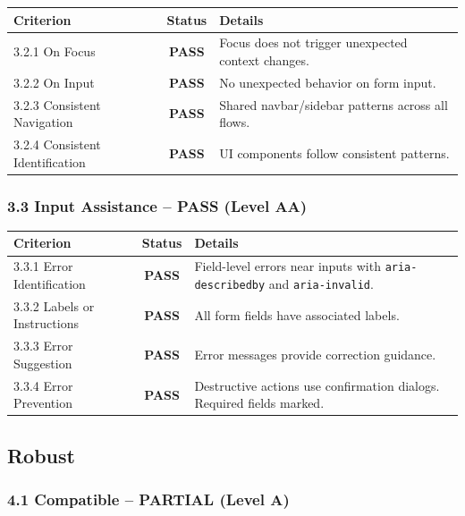 \documentclass[12pt,a4paper]{article}
\newcommand{\pass}{\textcolor{passgreen}{\textbf{PASS}}}
\newcommand{\partial}{\textcolor{warnorange}{\textbf{PARTIAL}}}
\begin{document}
\begin{table}[H]
\centering
\begin{tabularx}{\textwidth}{lcX}
\toprule
\textbf{Criterion} & \textbf{Status} & \textbf{Details} \\
\midrule
3.2.1 On Focus                 & \pass & Focus does not trigger unexpected context changes. \\
3.2.2 On Input                 & \pass & No unexpected behavior on form input. \\
3.2.3 Consistent Navigation    & \pass & Shared navbar/sidebar patterns across all flows. \\
3.2.4 Consistent Identification& \pass & UI components follow consistent patterns. \\
\bottomrule
\end{tabularx}
\end{table}

\subsubsection{3.3 Input Assistance -- \pass{} (Level AA)}

\begin{table}[H]
\centering
\begin{tabularx}{\textwidth}{lcX}
\toprule
\textbf{Criterion} & \textbf{Status} & \textbf{Details} \\
\midrule
3.3.1 Error Identification & \pass & Field-level errors near inputs with \texttt{aria-describedby} and \texttt{aria-invalid}. \\
3.3.2 Labels or Instructions& \pass & All form fields have associated labels. \\
3.3.3 Error Suggestion      & \pass & Error messages provide correction guidance. \\
3.3.4 Error Prevention      & \pass & Destructive actions use confirmation dialogs. Required fields marked. \\
\bottomrule
\end{tabularx}
\end{table}

\subsection{Robust}

\subsubsection{4.1 Compatible -- \partial{} (Level A)}
\end{document}

